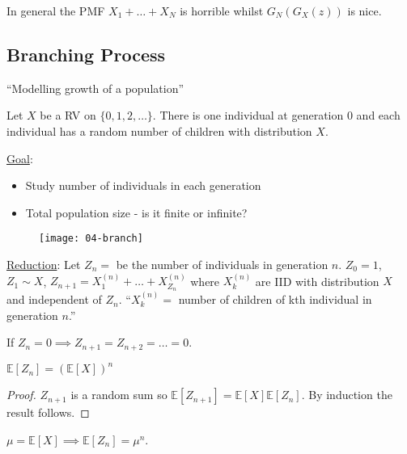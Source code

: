 In general the PMF $X_1 + \dots + X_N$ is horrible whilst $G_N(G_X(z))$ is nice.

\subsection{Branching Process} \color{blue} ``Modelling growth of a population'' \color{black}

\begin{definition}
    Let $X$ be a RV on $\{0, 1, 2, \dots\}$. 
    There is one individual at generation 0 and each individual has a random number of children with distribution $X$.
\end{definition} 

\underline{Goal}: 
\begin{itemize}
    \item Study number of individuals in each generation
    \item Total population size - is it finite or infinite?
\end{itemize} 

\begin{figure}
    \centering 
    \texttt{[image: 04-branch]} 
\end{figure} 

\underline{Reduction}: Let $Z_n =$ be the number of individuals in generation $n$.
$Z_0 = 1$, $Z_1 \sim X$, $Z_{n + 1} = X_1^{(n)} + \dots + X_{Z_n}^{(n)}$ where $X_k^{(n)}$ are IID with distribution $X$ and independent of $Z_n$. 
\color{blue}``$X_k^{(n)} =$ number of children of kth individual in generation $n$.'' \color{black}

\begin{note}
    If $Z_n = 0 \implies Z_{n + 1} = Z_{n + 2} = \dots = 0$.
\end{note} 

\begin{theorem}
    $\mathbb{E}[Z_n] = (\mathbb{E}[X])^n$
\end{theorem} 

\begin{proof}
    $Z_{n + 1}$ is a random sum so $\mathbb{E}[Z_{n + 1}] = \mathbb{E}[X] \mathbb{E}[Z_n]$.
    By induction the result follows. 
\end{proof}

\begin{notation}
    $\mu = \mathbb{E}[X] \implies \mathbb{E}[Z_n] = \mu^n$.
\end{notation} 

